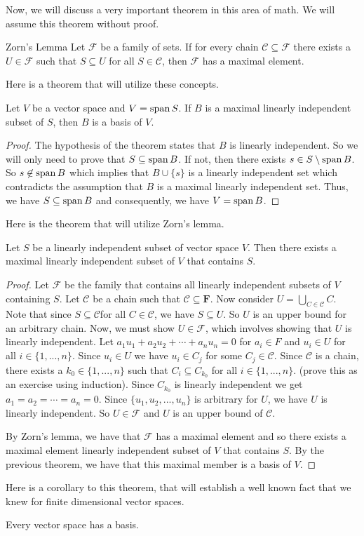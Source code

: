 \documentclass[main.tex]{subfiles}
\begin{document}
    Now, we will discuss a very important theorem in this area of math. We will assume this theorem without proof. 
    \begin{thrm}{Zorn's Lemma}{}
        Let $\mathcal{F}$ be a family of sets. If for every chain $\mathcal{C} \subseteq \mathcal{F}$ there exists a $U\in \mathcal{F}$ such that $S \subseteq U$ for all $S\in \mathcal{C}$, then $\mathcal{F}$ has a maximal element.
    \end{thrm}
    Here is a theorem that will utilize these concepts. 
    \begin{thrm}{}{}
        Let $V$ be a vector space and $V = \operatorname{span} S$. If $B$ is a maximal linearly independent subset of $S$, then $B$ is a basis of $V$. 
    \end{thrm}
    \begin{proof}
        The hypothesis of the theorem states that $B$ is linearly independent. So we will only need to prove that $S \subseteq \operatorname{span} B$. If not, then there exists $s\in S \setminus \operatorname{span} B$. So $s\not\in \operatorname{span} B$ which implies that $B\cup \{s\}$ is a linearly independent set which contradicts the assumption that $B$ is a maximal linearly independent set. Thus, we have $S \subseteq \operatorname{span} B$ and consequently, we have $V = \operatorname{span} B$. 
    \end{proof}

    Here is the theorem that will utilize Zorn's lemma. 
    \begin{thrm}{}{}
        Let $S$ be a linearly independent subset of vector space $V$. Then there exists a maximal linearly independent subset of $V$ that contains $S$. 
    \end{thrm}
    \begin{proof}
        Let $\mathcal{F}$ be the family that contains all linearly independent subsets of $V$ containing $S$. Let $\mathcal{C}$ be a chain such that $\mathcal{C} \subseteq \mathbf{F}$. Now consider $U = \bigcup_{C\in \mathcal{C}} C$. Note that since $S\subseteq \mathcal{C}$for all $C\in \mathcal{C}$, we have $S \subseteq U$. So $U$ is an upper bound for an arbitrary chain. Now, we must show $U\in \mathcal{F}$, which involves showing that $U$ is linearly independent. Let $a_1u_1 + a_2u_2 + \cdots + a_nu_n = 0$ for $a_i \in F$ and $u_i \in U$ for all $i \in \{1, ..., n\}$. Since $u_i \in U$ we have $u_i \in C_j$ for some $C_j \in \mathcal{C}$. Since $\mathcal{C}$ is a chain, there exists a $k_0 \in \{1, ..., n\}$ such that $C_i \subseteq C_{k_0}$ for all $i\in \{1, ..., n\}$. (prove this as an exercise using induction). Since $C_{k_0}$ is linearly independent we get $a_1 = a_2 = \cdots = a_n = 0$. Since $\{u_1, u_2, ..., u_n\}$ is arbitrary for $U$, we have $U$ is linearly independent. So $U\in \mathcal{F}$ and $U$ is an upper bound of $\mathcal{C}$. \bigbreak 

        By Zorn's lemma, we have that $\mathcal{F}$ has a maximal element and so there exists a maximal element linearly independent subset of $V$ that contains $S$. By the previous theorem, we have that this maximal member is a basis of $V$. 
    \end{proof}
    Here is a corollary to this theorem, that will establish a well known fact that we knew for finite dimensional vector spaces. 

    \begin{cor}{}{}
        Every vector space has a basis.
    \end{cor}
\end{document}
